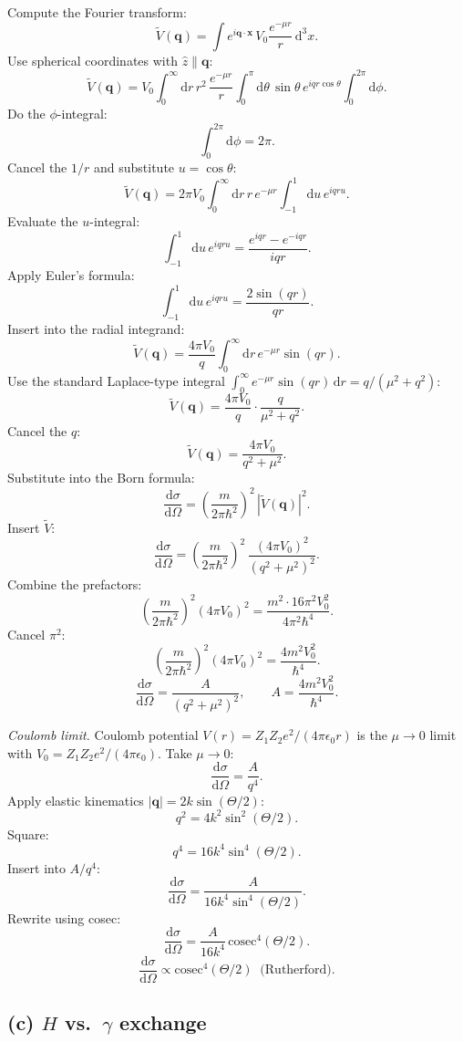 \documentclass[11pt]{article}
\newcommand{\de}{\mathrm{d}}
\begin{document}
Compute the Fourier transform:
\[ \tilde V(\bm q) = \int e^{i\bm q\cdot\bm x}\,V_0\frac{e^{-\mu r}}{r}\,\de^3 x. \]
Use spherical coordinates with $\hat z\parallel\bm q$:
\[ \tilde V(\bm q) = V_0 \int_0^\infty\!\de r\,r^2\,\frac{e^{-\mu r}}{r}\int_0^\pi\!\de\theta\,\sin\theta\,e^{iqr\cos\theta}\int_0^{2\pi}\!\de\phi. \]
Do the $\phi$-integral:
\[ \int_0^{2\pi}\de\phi = 2\pi. \]
Cancel the $1/r$ and substitute $u=\cos\theta$:
\[ \tilde V(\bm q) = 2\pi V_0\int_0^\infty\!\de r\,r\,e^{-\mu r}\int_{-1}^{1}\!\de u\,e^{iqru}. \]
Evaluate the $u$-integral:
\[ \int_{-1}^{1}\!\de u\,e^{iqru} = \frac{e^{iqr}-e^{-iqr}}{iqr}. \]
Apply Euler's formula:
\[ \int_{-1}^{1}\!\de u\,e^{iqru} = \frac{2\sin(qr)}{qr}. \]
Insert into the radial integrand:
\[ \tilde V(\bm q) = \frac{4\pi V_0}{q}\int_0^\infty\!\de r\,e^{-\mu r}\sin(qr). \]
Use the standard Laplace-type integral $\int_0^\infty e^{-\mu r}\sin(qr)\,\de r = q/(\mu^2+q^2)$:
\[ \tilde V(\bm q) = \frac{4\pi V_0}{q}\cdot\frac{q}{\mu^2+q^2}. \]
Cancel the $q$:
\[ \tilde V(\bm q) = \frac{4\pi V_0}{q^2 + \mu^2}. \]
Substitute into the Born formula:
\[ \frac{\de\sigma}{\de\Omega} = \left(\frac{m}{2\pi\hbar^2}\right)^2\,|\tilde V(\bm q)|^2. \]
Insert $\tilde V$:
\[ \frac{\de\sigma}{\de\Omega} = \left(\frac{m}{2\pi\hbar^2}\right)^2\,\frac{(4\pi V_0)^2}{(q^2+\mu^2)^2}. \]
Combine the prefactors:
\[ \left(\frac{m}{2\pi\hbar^2}\right)^2(4\pi V_0)^2 = \frac{m^2\cdot 16\pi^2 V_0^2}{4\pi^2\hbar^4}. \]
Cancel $\pi^2$:
\[ \left(\frac{m}{2\pi\hbar^2}\right)^2(4\pi V_0)^2 = \frac{4 m^2 V_0^2}{\hbar^4}. \]
\[ \boxed{\;\frac{\de\sigma}{\de\Omega} = \frac{A}{(q^2+\mu^2)^2},\qquad A = \frac{4 m^2 V_0^2}{\hbar^4}.\;} \]

\textit{Coulomb limit.} Coulomb potential $V(r)=Z_1Z_2 e^2/(4\pi\epsilon_0 r)$ is the $\mu\to 0$ limit with $V_0 = Z_1 Z_2 e^2/(4\pi\epsilon_0)$. Take $\mu\to 0$:
\[ \frac{\de\sigma}{\de\Omega} = \frac{A}{q^4}. \]
Apply elastic kinematics $|\bm q|=2k\sin(\Theta/2)$:
\[ q^2 = 4 k^2 \sin^2(\Theta/2). \]
Square:
\[ q^4 = 16 k^4 \sin^4(\Theta/2). \]
Insert into $A/q^4$:
\[ \frac{\de\sigma}{\de\Omega} = \frac{A}{16 k^4 \sin^4(\Theta/2)}. \]
Rewrite using cosec:
\[ \frac{\de\sigma}{\de\Omega} = \frac{A}{16 k^4}\,\mathrm{cosec}^4(\Theta/2). \]
\[ \boxed{\;\frac{\de\sigma}{\de\Omega}\propto \mathrm{cosec}^4(\Theta/2)\;\;\text{(Rutherford)}.\;} \]

\subsection*{(c) $H$ vs.\ $\gamma$ exchange}
\end{document}
